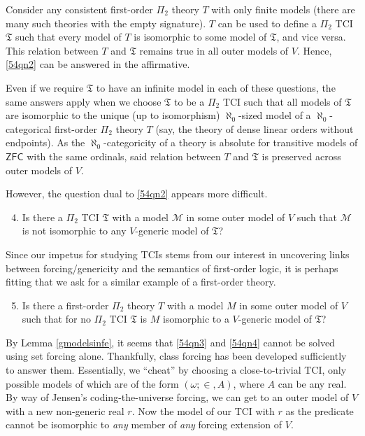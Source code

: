 \documentclass[12pt, twoside]{memoir}
\numberwithin{equation}{section}
\theoremstyle{definition}
\theoremstyle{remark}
\theoremstyle{definition}
\theoremstyle{definition}
\theoremstyle{definition}
\theoremstyle{remark}
\begin{document}
Consider any consistent first-order $\Pi_2$ theory $T$ with only finite models (there are many such theories with the empty signature). $T$ can be used to define a $\Pi_2$ TCI $\mathfrak{T}$ such that every model of $T$ is isomorphic to some model of $\mathfrak{T}$, and vice versa. This relation between $T$ and $\mathfrak{T}$ remains true in all outer models of $V$. Hence, \ref{54qn2} can be answered in the affirmative. 

Even if we require $\mathfrak{T}$ to have an infinite model in each of these questions, the same answers apply when we choose $\mathfrak{T}$ to be a $\Pi_2$ TCI such that all models of $\mathfrak{T}$ are isomorphic to the unique (up to isomorphism) $\aleph_0$-sized model of a $\aleph_0$-categorical first-order $\Pi_2$ theory $T$ (say, the theory of dense linear orders without endpoints). As the $\aleph_0$-categoricity of a theory is absolute for transitive models of $\mathsf{ZFC}$ with the same ordinals, said relation between $T$ and $\mathfrak{T}$ is preserved across outer models of $V$.

However, the question dual to \ref{54qn2} appears more difficult.

\begin{enumerate}[label=(Q\arabic*)]
    \setcounter{enumi}{3}
    \item\label{54qn3} Is there a $\Pi_2$ TCI $\mathfrak{T}$ with a model $\mathcal{M}$ in some outer model of $V$ such that $\mathcal{M}$ is not isomorphic to any $V$-generic model of $\mathfrak{T}$?
\end{enumerate}

Since our impetus for studying TCIs stems from our interest in uncovering links between forcing/genericity and the semantics of first-order logic, it is perhaps fitting that we ask for a similar example of a first-order theory. 

\begin{enumerate}[label=(Q\arabic*)]
    \setcounter{enumi}{4}
    \item\label{54qn4} Is there a first-order $\Pi_2$ theory $T$ with a model $M$ in some outer model of $V$ such that for no $\Pi_2$ TCI $\mathfrak{T}$ is $M$ isomorphic to a $V$-generic model of $\mathfrak{T}$?
\end{enumerate}

By Lemma \ref{gmodelsinfe}, it seems that \ref{54qn3} and \ref{54qn4} cannot be solved using set forcing alone. Thankfully, class forcing has been developed sufficiently to answer them. Essentially, we ``cheat'' by choosing a close-to-trivial TCI, only possible models of which are of the form $(\omega; \in, A)$, where $A$ can be any real. By way of Jensen's coding-the-universe forcing, we can get to an outer model of $V$ with a new non-generic real $r$. Now the model of our TCI with $r$ as the predicate cannot be isomorphic to \emph{any} member of \emph{any} forcing extension of $V$. 
\end{document}
